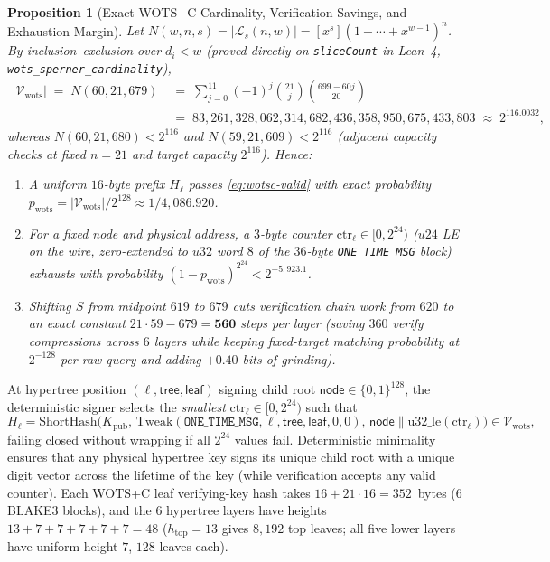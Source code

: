 \documentclass[11pt,a4paper]{article}
\newtheorem{proposition}[theorem]{Proposition}
\theoremstyle{definition}
\theoremstyle{remark}
\newcommand{\WOTSC}{\textsf{WOTS+C}}
\newcommand{\BLAKE}{\textsf{BLAKE3}}
\newcommand{\ShortHash}{\mathrm{ShortHash}}
\newcommand{\Tweak}{\mathrm{Tweak}}
\newcommand{\bits}{\{0,1\}}
\newcommand{\calL}{\mathcal{L}}
\newcommand{\calV}{\mathcal{V}}
\begin{document}
\begin{proposition}[Exact \WOTSC{} Cardinality, Verification Savings, and Exhaustion Margin]
\label{prop:wotsc}
Let $N(w, n, s) = |\calL_s(n, w)| = [x^s](1 + \cdots + x^{w-1})^n$. By inclusion--exclusion over $d_i < w$ (proved directly on \texttt{sliceCount} in Lean~4, \texttt{wots\_\allowbreak sperner\_\allowbreak cardinality}),
\begin{align*}
  |\calV_{\mathrm{wots}}| \;=\; N(60, 21, 679)
  &\;=\; \sum_{j=0}^{11} (-1)^j \binom{21}{j}\binom{699 - 60j}{20} \\
  &\;=\; 83{,}261{,}328{,}062{,}314{,}682{,}436{,}358{,}950{,}675{,}433{,}803 \;\approx\; 2^{116.0032},
\end{align*}
whereas $N(60, 21, 680) < 2^{116}$ and $N(59, 21, 609) < 2^{116}$ (adjacent capacity checks at fixed $n = 21$ and target capacity $2^{116}$). Hence:
\begin{enumerate}[leftmargin=1.4em,itemsep=1pt]
  \item A uniform $16$-byte prefix $H_\ell$ passes \eqref{eq:wotsc-valid} with exact probability $p_{\mathrm{wots}} = |\calV_{\mathrm{wots}}| / 2^{128} \approx 1 / 4{,}086.920$.
  \item For a fixed node and physical address, a $3$-byte counter $\mathrm{ctr}_\ell \in [0, 2^{24})$ ($u24$ LE on the wire, zero-extended to $u32$ word $8$ of the $36$-byte \texttt{ONE\_TIME\_MSG} block) exhausts with probability $(1 - p_{\mathrm{wots}})^{2^{24}} < 2^{-5{,}923.1}$.
  \item Shifting $S$ from midpoint $619$ to $679$ cuts verification chain work from $620$ to an \emph{exact constant} $21 \cdot 59 - 679 = \mathbf{560}$ steps per layer (saving $360$ verify compressions across $6$ layers while keeping fixed-target matching probability at $2^{-128}$ per raw query and adding $+0.40$ bits of grinding).
\end{enumerate}
\end{proposition}

At hypertree position $(\ell, \mathsf{tree}, \mathsf{leaf})$ signing child root $\mathsf{node} \in \bits^{128}$, the deterministic signer selects the \emph{smallest} $\mathrm{ctr}_\ell \in [0, 2^{24})$ such that
\[
  H_\ell = \ShortHash\big(K_{\mathrm{pub}},\, \Tweak(\mathtt{ONE\_TIME\_MSG}, \ell, \mathsf{tree}, \mathsf{leaf}, 0, 0),\, \mathsf{node} \parallel \mathrm{u32\_le}(\mathrm{ctr}_\ell)\big) \in \calV_{\mathrm{wots}},
\]
failing closed without wrapping if all $2^{24}$ values fail. Deterministic minimality ensures that any physical hypertree key signs its unique child root with a unique digit vector across the lifetime of the key (while verification accepts any valid counter). Each \WOTSC{} leaf verifying-key hash takes $16 + 21 \cdot 16 = 352$~bytes ($6$ \BLAKE{} blocks), and the $6$ hypertree layers have heights $13 + 7 + 7 + 7 + 7 + 7 = 48$ ($h_{\mathrm{top}} = 13$ gives $8{,}192$ top leaves; all five lower layers have uniform height $7$, $128$ leaves each).
\end{document}
